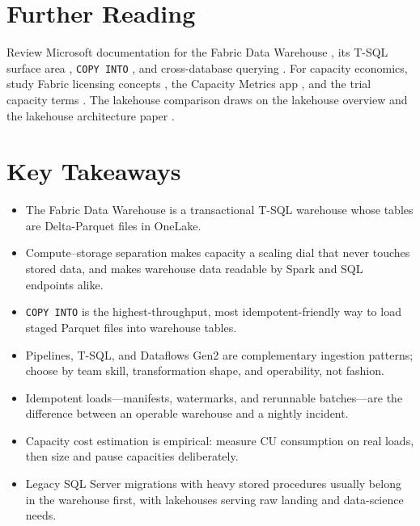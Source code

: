 \section{Further Reading}
Review Microsoft documentation for the Fabric Data Warehouse \cite{microsoftFabricWarehouse}, its T-SQL surface area \cite{microsoftFabricWarehouseTSQL}, \texttt{COPY INTO} \cite{microsoftFabricCopyInto}, and cross-database querying \cite{microsoftFabricCrossQuery}. For capacity economics, study Fabric licensing concepts \cite{microsoftFabricCapacity}, the Capacity Metrics app \cite{microsoftFabricMetricsApp}, and the trial capacity terms \cite{microsoftFabricTrial}. The lakehouse comparison draws on the lakehouse overview \cite{microsoftFabricLakehouse} and the lakehouse architecture paper \cite{armbrust2021lakehouse}.

\section*{Key Takeaways}
\begin{itemize}
    \item The Fabric Data Warehouse is a transactional T-SQL warehouse whose tables are Delta-Parquet files in OneLake.
    \item Compute--storage separation makes capacity a scaling dial that never touches stored data, and makes warehouse data readable by Spark and SQL endpoints alike.
    \item \texttt{COPY INTO} is the highest-throughput, most idempotent-friendly way to load staged Parquet files into warehouse tables.
    \item Pipelines, T-SQL, and Dataflows Gen2 are complementary ingestion patterns; choose by team skill, transformation shape, and operability, not fashion.
    \item Idempotent loads---manifests, watermarks, and rerunnable batches---are the difference between an operable warehouse and a nightly incident.
    \item Capacity cost estimation is empirical: measure CU consumption on real loads, then size and pause capacities deliberately.
    \item Legacy SQL Server migrations with heavy stored procedures usually belong in the warehouse first, with lakehouses serving raw landing and data-science needs.
\end{itemize}

